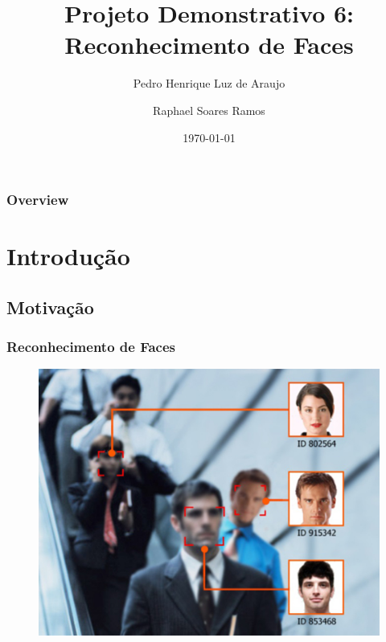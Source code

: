 \documentclass{beamer}
\title[PD6]{Projeto Demonstrativo 6: Reconhecimento de Faces} %
\author[Luz de Araujo, P.H.; Ramos, R.S.]{Pedro Henrique Luz de Araujo \and Raphael Soares Ramos} %
\institute[UnB] %
{
Universidade de Brasília \\ %
\medskip
\textit{\{pedrohluzaraujo, raphael.soares.1996\}@gmail.com} %
}
\date{\today} %
\begin{document}
\begin{frame}
\titlepage %
\end{frame}

\begin{frame}
\frametitle{Overview} %
\tableofcontents %
\end{frame}


\section{Introdução}
\subsection{Motivação}
\begin{frame}
\frametitle{Reconhecimento de Faces}
\begin{figure}
\includegraphics[width=0.75\linewidth]{figs/security.jpg}
\end{figure}
\end{frame}
\end{document}
